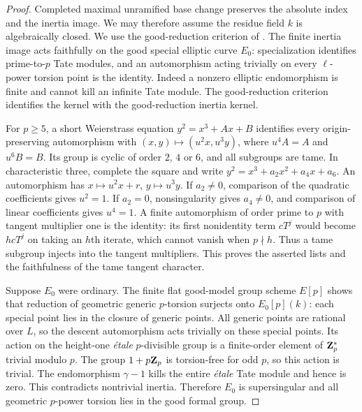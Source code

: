 \begin{proof}
Completed maximal unramified base change preserves the absolute index and the inertia image. We may therefore assume the residue field $k$ is algebraically closed. We use the good-reduction criterion of \citet[Theorem~1 and Corollary~4, pp.~493--494]{SerreTate1968}. The finite inertia image acts faithfully on the good special elliptic curve $E_0$: specialization identifies prime-to-$p$ Tate modules, and an automorphism acting trivially on every $\ell$-power torsion point is the identity. Indeed a nonzero elliptic endomorphism is finite and cannot kill an infinite Tate module. The good-reduction criterion identifies the kernel with the good-reduction inertia kernel.

For $p\ge5$, a short Weierstrass equation $y^2=x^3+Ax+B$ identifies every origin-preserving automorphism with
$(x,y)\mapsto(u^2x,u^3y)$, where $u^4A=A$ and $u^6B=B$. Its group is cyclic of order $2$, $4$ or $6$, and all subgroups are tame. In characteristic three, complete the square and write
$y^2=x^3+a_2x^2+a_4x+a_6$. An automorphism has
$x\mapsto u^2x+r$, $y\mapsto u^3y$. If $a_2\ne0$, comparison of the quadratic coefficients gives $u^2=1$. If $a_2=0$, nonsingularity gives $a_4\ne0$, and comparison of linear coefficients gives $u^4=1$. A finite automorphism of order prime to $p$ with tangent multiplier one is the identity: its first nonidentity term $cT^j$ would become $hcT^j$ on taking an $h$th iterate, which cannot vanish when $p\nmid h$. Thus a tame subgroup injects into the tangent multipliers. This proves the asserted lists and the faithfulness of the tame tangent character.

Suppose $E_0$ were ordinary. The finite flat good-model group scheme $E[p]$ shows that reduction of geometric generic $p$-torsion surjects onto $E_0[p](k)$: each special point lies in the closure of generic points. All generic points are rational over $L$, so the descent automorphism acts trivially on these special points. Its action on the height-one \emph{\'etale} $p$-divisible group is a finite-order element of $\mathbf Z_p^*$ trivial modulo $p$. The group $1+p\mathbf Z_p$ is torsion-free for odd $p$, so this action is trivial. The endomorphism $\gamma-1$ kills the entire \emph{\'etale} Tate module and hence is zero. This contradicts nontrivial inertia. Therefore $E_0$ is supersingular and all geometric $p$-power torsion lies in the good formal group.


\end{proof}
